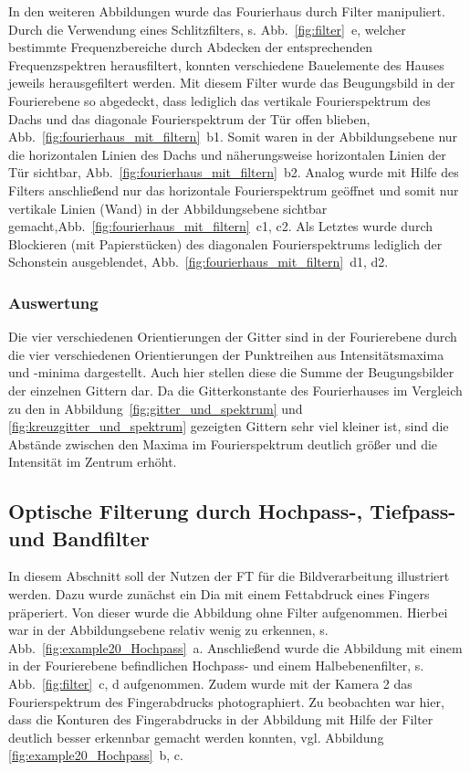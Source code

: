 In den weiteren Abbildungen wurde das Fourierhaus durch Filter manipuliert. Durch die Verwendung eines Schlitzfilters, s. Abb.~\ref{fig:filter}~e, welcher bestimmte Frequenzbereiche durch Abdecken der entsprechenden Frequenzspektren herausfiltert, konnten verschiedene Bauelemente des Hauses jeweils herausgefiltert werden. Mit diesem Filter wurde das Beugungsbild in der Fourierebene so abgedeckt, dass lediglich das vertikale Fourierspektrum des Dachs und das diagonale Fourierspektrum der Tür offen blieben, Abb.~\ref{fig:fourierhaus_mit_filtern}~b1. Somit waren in der Abbildungsebene nur die horizontalen Linien des Dachs und näherungsweise horizontalen Linien der Tür sichtbar, Abb.~\ref{fig:fourierhaus_mit_filtern}~b2. Analog wurde mit Hilfe des Filters anschließend nur das horizontale Fourierspektrum geöffnet und somit nur vertikale Linien (Wand) in der Abbildungsebene sichtbar gemacht,Abb.~\ref{fig:fourierhaus_mit_filtern}~c1, c2. Als Letztes wurde durch Blockieren (mit Papierstücken) des diagonalen Fourierspektrums lediglich der Schonstein ausgeblendet, Abb.~\ref{fig:fourierhaus_mit_filtern}~d1, d2.

\subsubsection*{Auswertung}
Die vier verschiedenen Orientierungen der Gitter sind in der Fourierebene durch die vier verschiedenen Orientierungen der Punktreihen aus Intensitätsmaxima und -minima dargestellt. Auch hier stellen diese die Summe der Beugungsbilder der einzelnen Gittern dar. Da die Gitterkonstante des Fourierhauses im Vergleich zu den in Abbildung~\ref{fig:gitter_und_spektrum} und \ref{fig:kreuzgitter_und_spektrum} gezeigten Gittern sehr viel kleiner ist, sind die Abstände zwischen den Maxima im Fourierspektrum deutlich größer und die Intensität im Zentrum erhöht.


\subsection{Optische Filterung durch Hochpass-, Tiefpass- und Bandfilter}

In diesem Abschnitt soll der Nutzen der FT für die Bildverarbeitung illustriert werden. Dazu wurde zunächst ein Dia mit einem Fettabdruck eines Fingers präperiert. Von dieser wurde die Abbildung ohne Filter aufgenommen. Hierbei war in der Abbildungsebene relativ wenig zu erkennen, s. Abb.~\ref{fig:example20_Hochpass}~a. Anschließend wurde die Abbildung mit einem in der Fourierebene befindlichen Hochpass- und einem Halbebenenfilter, s. Abb.~\ref{fig:filter}~c, d aufgenommen. Zudem wurde mit der Kamera 2 das Fourierspektrum des Fingerabdrucks photographiert. Zu beobachten war hier, dass die Konturen des Fingerabdrucks in der Abbildung mit Hilfe der Filter deutlich besser erkennbar gemacht werden konnten, vgl. Abbildung \ref{fig:example20_Hochpass}~b, c.

